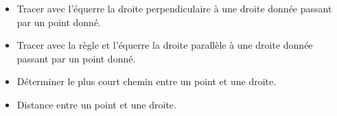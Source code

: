 \begin{prerequis}    
   \begin{itemize}
        \item[\emoji{diamond-suit}] Tracer avec l’équerre la droite perpendiculaire à une droite donnée passant par un point donné.
        \item[\emoji{diamond-suit}] Tracer avec la règle et l’équerre la droite parallèle à une droite donnée passant par un point donné.
        \columnbreak
        \item[\emoji{diamond-suit}] Déterminer le plus court chemin entre un point et une droite.
        \item[\emoji{red-heart}] Distance entre un point et une droite.        
   \end{itemize}
\end{prerequis}